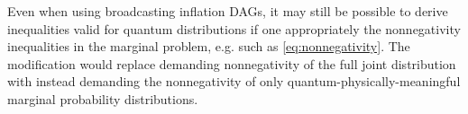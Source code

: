 




Even when using broadcasting inflation DAGs, it may still be possible to derive inequalities valid for quantum distributions if one appropriately the nonnegativity inequalities in the marginal problem, e.g. such as \cref{eq:nonnegativity}. The modification would replace demanding nonnegativity of the full joint distribution with instead demanding the nonnegativity of only quantum-physically-meaningful marginal probability distributions. 

